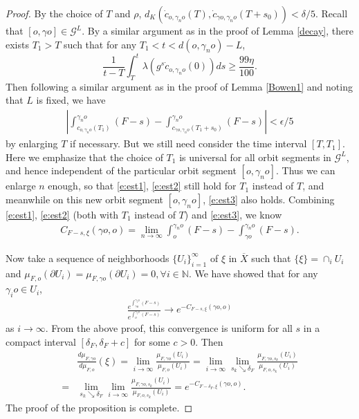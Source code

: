 \documentclass[10pt,a4paper]{amsart}
\def\C{\Gamma}
\def\NN{{\mathbb N}}
\def\c{\gamma}   \def\C{\Gamma}
\def\d{\delta}   %
\def\e{\epsilon}
\newcommand{\GGG}{\mathcal{G}}
\begin{document}
\begin{proof}
By the choice of $T$ and $\rho$, $d_K(\dot c_{o,\c_n o}(T),\dot c_{\c o,\c_n o}(T+s_0))<\d/5$.
Recall that $[o,\c o]\in \GGG^L$. By a similar argument as in the proof of Lemma \ref{decay}, there exists $T_1>T$ such that for any $T_1<t<d(o,\c_no)-L$,
\[\frac{1}{t-T}\int_T^t\lambda(g^s \dot c_{o,\c_n o}(0))ds\ge \frac{99\eta}{100}.\]
Then following a similar argument as in the proof of Lemma \ref{Bowen1} and noting that $L$ is fixed, we have
\begin{equation}\label{e:est3}
\begin{aligned}
\left|\int_{c_{o,\c_n o}(T_1)}^{\c_n o}(F-s)-\int_{c_{\c o,\c_n o}(T_1+s_0)}^{\c_n o}(F-s)\right|<\e/5
\end{aligned}
\end{equation}
by enlarging $T$ if necessary. But we still need consider the time interval $[T,T_1]$. Here we emphasize that the choice of $T_1$ is universal for all orbit segments in $\GGG^L$, and hence independent of the particular orbit segment $[o,\c_n o]$. Thus we can enlarge $n$ enough, so that  \eqref{e:est1}, \eqref{e:est2} still hold for $T_1$ instead of $T$, and meanwhile on this new orbit segment $[o,\c_n o]$, \eqref{e:est3} also holds.
Combining \eqref{e:est1}, \eqref{e:est2} (both with $T_1$ instead of $T$) and \eqref{e:est3}, we know
\begin{equation*}
\begin{aligned}
C_{F-s,\xi}(\c o,o)=\lim_{n\to \infty }\int_{o}^{\c_n o}(F-s)-\int_{\c o}^{\c_n o}(F-s).
\end{aligned}
\end{equation*}

Now take a sequence of neighborhoods $\{U_i\}_{i=1}^\infty$ of $\xi$ in $\overline X$ such that $\{\xi\}=\cap_{i} U_i$ and $\mu_{F,o}(\partial U_i)=\mu_{F,\c o}(\partial U_i)=0, \forall i\in \NN$. We have showed that for any $\c_i o\in U_i$,
\begin{equation*}
\begin{aligned}
\frac{e^{\int_{\c o}^{\c_i o}(F-s)}}{e^{\int_{o}^{\c_i o}(F-s)}}\to e^{-C_{F-s,\xi}(\c o,o)}
\end{aligned}
\end{equation*}
as $i\to \infty$. From the above proof, this convergence is uniform for all $s$ in a compact interval $[\d_F, \d_F+c]$ for some $c>0$.
Then
\begin{equation*}
\begin{aligned}
&\frac{d\mu_{F,\c o}}{d\mu_{F,o}}(\xi)=\lim_{i\to \infty}\frac{\mu_{F, \c o}(U_i)}{\mu_{F, o}(U_i)}=\lim_{i\to \infty}\lim_{s_k\searrow \d_F}\frac{\mu_{F, \c o,s_k}(U_i)}{\mu_{F, o,s_k}(U_i)}\\
=&\lim_{s_k\searrow \d_F}\lim_{i\to \infty}\frac{\mu_{F, \c o,s_k}(U_i)}{\mu_{F, o,s_k}(U_i)}=e^{-C_{F-\d_F,\xi}(\c o, o)}.
\end{aligned}
\end{equation*}
The proof of the proposition is complete.
\end{proof}
\end{document}
